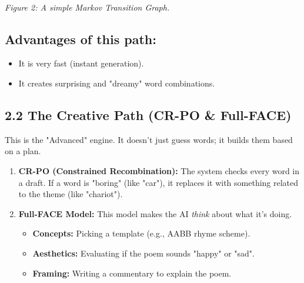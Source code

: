 \documentclass[12pt, a4paper]{article}
\begin{document}
\begin{center}
    \small \\ \textit{Figure 2: A simple Markov Transition Graph.}
\end{center}

\subsection{Advantages of this path:}
\begin{itemize}
    \item It is very fast (instant generation).
    \item It creates surprising and "dreamy" word combinations.
\end{itemize}

\newpage

\subsection{2.2 The Creative Path (CR-PO \& Full-FACE)}
This is the "Advanced" engine. It doesn't just guess words; it builds them based on a plan.

\begin{enumerate}
    \item \textbf{CR-PO (Constrained Recombination):} The system checks every word in a draft. If a word is "boring" (like "car"), it replaces it with something related to the theme (like "chariot").
    \item \textbf{Full-FACE Model:} This model makes the AI \textit{think} about what it's doing.
    \begin{itemize}
        \item \textbf{Concepts:} Picking a template (e.g., AABB rhyme scheme).
        \item \textbf{Aesthetics:} Evaluating if the poem sounds "happy" or "sad".
        \item \textbf{Framing:} Writing a commentary to explain the poem.
    \end{itemize}
\end{enumerate}
\end{document}
